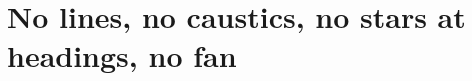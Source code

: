 \documentclass[10pt,a4paper]{article}
\begin{document}
\section{No lines, no caustics, no stars at headings, no fan}\lipsum[1-6]
\end{document}
